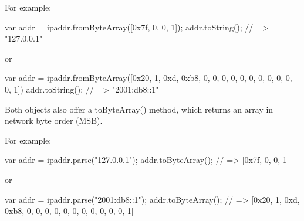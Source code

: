 For example\+: 
\begin{DoxyCode}
var addr = ipaddr.fromByteArray([0x7f, 0, 0, 1]);
addr.toString(); // => "127.0.0.1"
\end{DoxyCode}


or


\begin{DoxyCode}
var addr = ipaddr.fromByteArray([0x20, 1, 0xd, 0xb8, 0, 0, 0, 0, 0, 0, 0, 0, 0, 0, 0, 1])
addr.toString(); // => "2001:db8::1"
\end{DoxyCode}


Both objects also offer a {\ttfamily to\+Byte\+Array()} method, which returns an array in network byte order (M\+SB).

For example\+: 
\begin{DoxyCode}
var addr = ipaddr.parse("127.0.0.1");
addr.toByteArray(); // => [0x7f, 0, 0, 1]
\end{DoxyCode}


or


\begin{DoxyCode}
var addr = ipaddr.parse("2001:db8::1");
addr.toByteArray(); // => [0x20, 1, 0xd, 0xb8, 0, 0, 0, 0, 0, 0, 0, 0, 0, 0, 0, 1]
\end{DoxyCode}
 